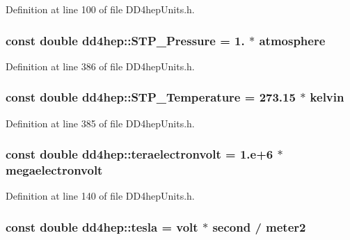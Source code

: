 Definition at line 100 of file DD4hepUnits.h.\hypertarget{namespacedd4hep_a9ace4de2d3dba6a0e6f3d0ab29a498aa}{
\subsubsection[{STP\_\-Pressure}]{\setlength{\rightskip}{0pt plus 5cm}const double {\bf dd4hep::STP\_\-Pressure} = 1. $\ast$ {\bf atmosphere}}}
\label{namespacedd4hep_a9ace4de2d3dba6a0e6f3d0ab29a498aa}


Definition at line 386 of file DD4hepUnits.h.\hypertarget{namespacedd4hep_a3036c66b7815e25873b1183c2af953d6}{
\subsubsection[{STP\_\-Temperature}]{\setlength{\rightskip}{0pt plus 5cm}const double {\bf dd4hep::STP\_\-Temperature} = 273.15 $\ast$ {\bf kelvin}}}
\label{namespacedd4hep_a3036c66b7815e25873b1183c2af953d6}


Definition at line 385 of file DD4hepUnits.h.\hypertarget{namespacedd4hep_ac482cce1ba221816734b1a3384f958d9}{
\subsubsection[{teraelectronvolt}]{\setlength{\rightskip}{0pt plus 5cm}const double {\bf dd4hep::teraelectronvolt} = 1.e+6 $\ast$ {\bf megaelectronvolt}}}
\label{namespacedd4hep_ac482cce1ba221816734b1a3384f958d9}


Definition at line 140 of file DD4hepUnits.h.\hypertarget{namespacedd4hep_aaddab60c1ddca9986195f0d5cfe03259}{
\subsubsection[{tesla}]{\setlength{\rightskip}{0pt plus 5cm}const double {\bf dd4hep::tesla} = {\bf volt} $\ast$ {\bf second} / {\bf meter2}}}
\label{namespacedd4hep_aaddab60c1ddca9986195f0d5cfe03259}


